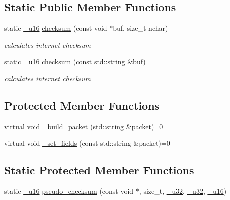 \subsection*{Static Public Member Functions}
\begin{CompactItemize}
\item 
static \hyperlink{namespacesocketpp_0d48e817f00cbb84d07faec41ee4b169}{\_\-u16} \hyperlink{classsocketpp_1_1RawSocket_bb78ecebb5bd5ab5be4ee46d786fe5cd}{checksum} (const void $\ast$buf, size\_\-t nchar)
\begin{CompactList}\small\item\em calculates internet checksum \item\end{CompactList}\item 
static \hyperlink{namespacesocketpp_0d48e817f00cbb84d07faec41ee4b169}{\_\-u16} \hyperlink{classsocketpp_1_1RawSocket_67af2c9f3bc37146b54fc9fb69c0dd8d}{checksum} (const std::string \&buf)
\begin{CompactList}\small\item\em calculates internet checksum \item\end{CompactList}\end{CompactItemize}
\subsection*{Protected Member Functions}
\begin{CompactItemize}
\item 
virtual void \hyperlink{classsocketpp_1_1RawSocket_eb0a3f716c0fc46efa4123acf0fe1e66}{\_\-build\_\-packet} (std::string \&packet)=0
\item 
virtual void \hyperlink{classsocketpp_1_1RawSocket_45e6b041703cb8ae0f93dd19766865d5}{\_\-set\_\-fields} (const std::string \&packet)=0
\end{CompactItemize}
\subsection*{Static Protected Member Functions}
\begin{CompactItemize}
\item 
static \hyperlink{namespacesocketpp_0d48e817f00cbb84d07faec41ee4b169}{\_\-u16} \hyperlink{classsocketpp_1_1RawSocket_c9422942a0ed23c9900d26426a96a0ee}{pseudo\_\-checksum} (const void $\ast$, size\_\-t, \hyperlink{namespacesocketpp_d9c3b2ad093bb5814af59760e0a2192a}{\_\-u32}, \hyperlink{namespacesocketpp_d9c3b2ad093bb5814af59760e0a2192a}{\_\-u32}, \hyperlink{namespacesocketpp_0d48e817f00cbb84d07faec41ee4b169}{\_\-u16})
\end{CompactItemize}
